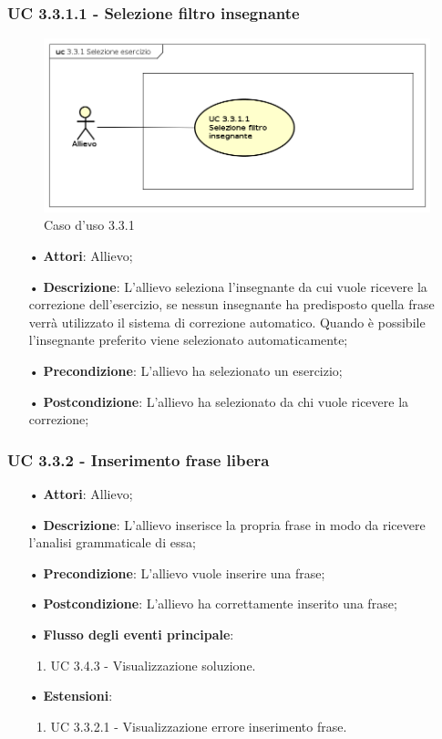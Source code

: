 \subsubsection{UC 3.3.1.1 - Selezione filtro insegnante}\begin{figure}[H]
\centering
\includegraphics[width=17cm]{img/UC331.png} 
\caption{Caso d'uso 3.3.1}\label{fig:331}
\end{figure}
\begin{itemize}
\item[•]\textbf{Attori}: Allievo;
\item[•]\textbf{Descrizione}: L'allievo seleziona l'insegnante da cui vuole ricevere la correzione dell'esercizio, se nessun insegnante ha predisposto quella frase verrà utilizzato il sistema di correzione automatico. Quando è possibile l'insegnante preferito viene selezionato automaticamente;
\item[•]\textbf{Precondizione}: L'allievo ha selezionato un esercizio;
\item[•]\textbf{Postcondizione}: L'allievo ha selezionato da chi vuole ricevere la correzione;
\end{itemize}

\subsubsection{UC 3.3.2 - Inserimento frase libera}
\begin{itemize}
\item[•]\textbf{Attori}: Allievo;
\item[•]\textbf{Descrizione}: L'allievo inserisce la propria frase in modo da ricevere l'analisi grammaticale di essa;
\item[•]\textbf{Precondizione}: L'allievo vuole inserire una frase;
\item[•]\textbf{Postcondizione}: L'allievo ha correttamente inserito una frase;
\item[•]\textbf{Flusso degli eventi principale}:
\begin{enumerate}
\item UC 3.4.3 - Visualizzazione soluzione.
\end{enumerate}
\item[•]\textbf{Estensioni}:
\begin{enumerate}
\item UC 3.3.2.1 - Visualizzazione errore inserimento frase.
\end{enumerate}
\end{itemize}

